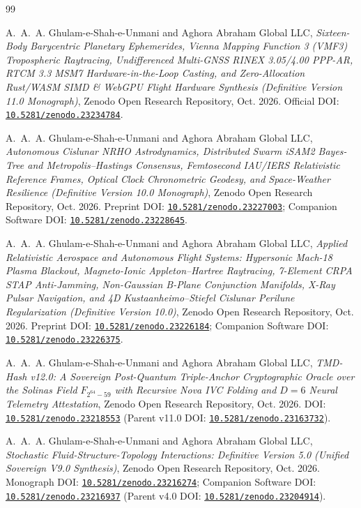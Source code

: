\documentclass[11pt,a4paper,reqno]{article}
\def\mathbb#1{#1}%
\newcommand{\zenodo}[1]{\href{https://doi.org/10.5281/zenodo.#1}{\nolinkurl{10.5281/zenodo.#1}}}
\theoremstyle{plain}
\theoremstyle{definition}
\theoremstyle{remark}
\numberwithin{equation}{section}
\begin{document}
\begin{thebibliography}{99}

A.~A.~A. Ghulam-e-Shah-e-Unmani and {Aghora Abraham Global LLC},
\emph{Sixteen-Body Barycentric Planetary Ephemerides, Vienna Mapping Function 3 (VMF3) Tropospheric Raytracing, Undifferenced Multi-GNSS RINEX 3.05/4.00 PPP-AR, RTCM 3.3 MSM7 Hardware-in-the-Loop Casting, and Zero-Allocation Rust/WASM SIMD \& WebGPU Flight Hardware Synthesis (Definitive Version 11.0 Monograph)},
Zenodo Open Research Repository, Oct. 2026.
Official DOI: \zenodo{23234784}.

A.~A.~A. Ghulam-e-Shah-e-Unmani and {Aghora Abraham Global LLC},
\emph{Autonomous Cislunar NRHO Astrodynamics, Distributed Swarm iSAM2 Bayes-Tree and Metropolis--Hastings Consensus, Femtosecond IAU/IERS Relativistic Reference Frames, Optical Clock Chronometric Geodesy, and Space-Weather Resilience (Definitive Version 10.0 Monograph)},
Zenodo Open Research Repository, Oct. 2026.
Preprint DOI: \zenodo{23227003}; Companion Software DOI: \zenodo{23228645}.

A.~A.~A. Ghulam-e-Shah-e-Unmani and {Aghora Abraham Global LLC},
\emph{Applied Relativistic Aerospace and Autonomous Flight Systems: Hypersonic Mach-18 Plasma Blackout, Magneto-Ionic Appleton--Hartree Raytracing, 7-Element CRPA STAP Anti-Jamming, Non-Gaussian B-Plane Conjunction Manifolds, X-Ray Pulsar Navigation, and 4D Kustaanheimo--Stiefel Cislunar Perilune Regularization (Definitive Version 10.0)},
Zenodo Open Research Repository, Oct. 2026.
Preprint DOI: \zenodo{23226184}; Companion Software DOI: \zenodo{23226375}.

A.~A.~A. Ghulam-e-Shah-e-Unmani and {Aghora Abraham Global LLC},
\emph{TMD-Hash v12.0: A Sovereign Post-Quantum Triple-Anchor Cryptographic Oracle over the Solinas Field $\mathbb{F}_{2^{64}-59}$ with Recursive Nova IVC Folding and $D=6$ Neural Telemetry Attestation},
Zenodo Open Research Repository, Oct. 2026.
DOI: \zenodo{23218553} (Parent v11.0 DOI: \zenodo{23163732}).

A.~A.~A. Ghulam-e-Shah-e-Unmani and {Aghora Abraham Global LLC},
\emph{Stochastic Fluid-Structure-Topology Interactions: Definitive Version 5.0 (Unified Sovereign V9.0 Synthesis)},
Zenodo Open Research Repository, Oct. 2026.
Monograph DOI: \zenodo{23216274}; Companion Software DOI: \zenodo{23216937} (Parent v4.0 DOI: \zenodo{23204914}).


\end{thebibliography}
\end{document}
